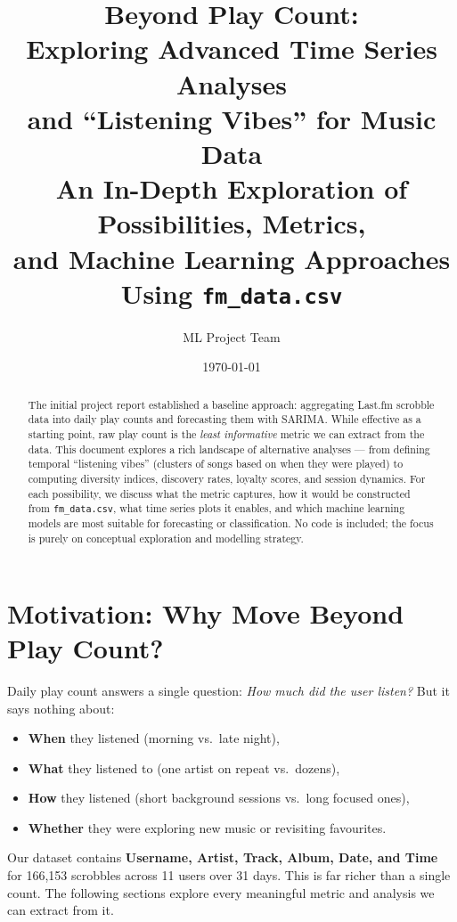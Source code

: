 \documentclass[12pt, a4paper]{article}
\title{
    \vspace{-1cm}
    \textbf{Beyond Play Count:\\
    Exploring Advanced Time Series Analyses\\
    and ``Listening Vibes'' for Music Data}\\[0.5em]
    \large An In-Depth Exploration of Possibilities, Metrics,\\
    and Machine Learning Approaches Using \texttt{fm\_data.csv}
}
\author{ML Project Team}
\date{\today}
\begin{document}
\maketitle
\thispagestyle{fancy}

\begin{abstract}
The initial project report established a baseline approach: aggregating
Last.fm scrobble data into daily play counts and forecasting them with
SARIMA. While effective as a starting point, raw play count is the
\emph{least informative} metric we can extract from the data. This document
explores a rich landscape of alternative analyses --- from defining temporal
``listening vibes'' (clusters of songs based on when they were played) to
computing diversity indices, discovery rates, loyalty scores, and session
dynamics. For each possibility, we discuss what the metric captures, how it
would be constructed from \texttt{fm\_data.csv}, what time series plots it
enables, and which machine learning models are most suitable for forecasting
or classification. No code is included; the focus is purely on conceptual
exploration and modelling strategy.
\end{abstract}

\tableofcontents
\newpage

\section{Motivation: Why Move Beyond Play Count?}

Daily play count answers a single question: \emph{How much did the user
listen?} But it says nothing about:

\begin{itemize}
    \item \textbf{When} they listened (morning vs.\ late night),
    \item \textbf{What} they listened to (one artist on repeat vs.\ dozens),
    \item \textbf{How} they listened (short background sessions vs.\ long
          focused ones),
    \item \textbf{Whether} they were exploring new music or revisiting
          favourites.
\end{itemize}

Our dataset contains \textbf{Username, Artist, Track, Album, Date, and Time}
for 166{,}153 scrobbles across 11 users over 31 days. This is far richer
than a single count. The following sections explore every meaningful metric
and analysis we can extract from it.
\end{document}
